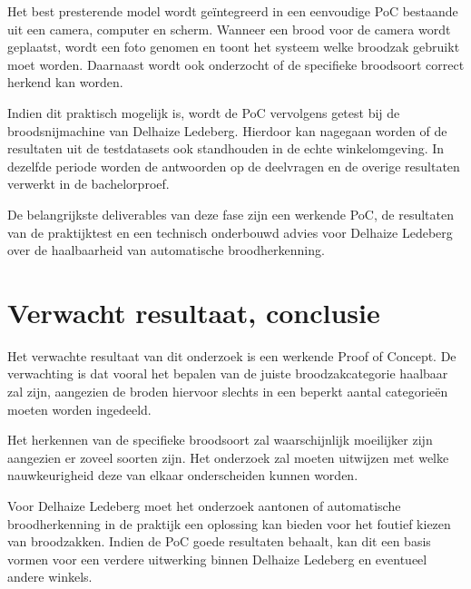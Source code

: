Het best presterende model wordt geïntegreerd in een eenvoudige PoC bestaande uit een camera, computer en scherm. Wanneer een brood voor de camera wordt geplaatst, wordt een foto genomen en toont het systeem welke broodzak gebruikt moet worden. Daarnaast wordt ook onderzocht of de specifieke broodsoort correct herkend kan worden.

Indien dit praktisch mogelijk is, wordt de PoC vervolgens getest bij de broodsnijmachine van Delhaize Ledeberg. Hierdoor kan nagegaan worden of de resultaten uit de testdatasets ook standhouden in de echte winkelomgeving. In dezelfde periode worden de antwoorden op de deelvragen en de overige resultaten verwerkt in de bachelorproef.

De belangrijkste deliverables van deze fase zijn een werkende PoC, de resultaten van de praktijktest en een technisch onderbouwd advies voor Delhaize Ledeberg over de haalbaarheid van automatische broodherkenning.



\section{Verwacht resultaat, conclusie}
\label{sec:verwachte_resultaten}

Het verwachte resultaat van dit onderzoek is een werkende Proof of Concept. De verwachting is dat vooral het bepalen van de juiste broodzakcategorie haalbaar zal zijn, aangezien de broden hiervoor slechts in een beperkt aantal categorieën moeten worden ingedeeld.

Het herkennen van de specifieke broodsoort zal waarschijnlijk moeilijker zijn aangezien er zoveel soorten zijn. Het onderzoek zal moeten uitwijzen met welke nauwkeurigheid deze van elkaar onderscheiden kunnen worden.

Voor Delhaize Ledeberg moet het onderzoek aantonen of automatische broodherkenning in de praktijk een oplossing kan bieden voor het foutief kiezen van broodzakken. Indien de PoC goede resultaten behaalt, kan dit een basis vormen voor een verdere uitwerking binnen Delhaize Ledeberg en eventueel andere winkels.